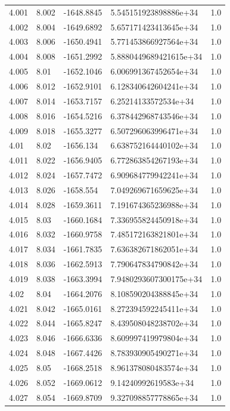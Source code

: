 \begin{tabular}{lllll}
4.001 & 8.002 & -1648.8845 & 5.545151923898886e+34 & 1.0 \\
4.002 & 8.004 & -1649.6892 & 5.657171423413645e+34 & 1.0 \\
4.003 & 8.006 & -1650.4941 & 5.771453866927564e+34 & 1.0 \\
4.004 & 8.008 & -1651.2992 & 5.8880449689421615e+34 & 1.0 \\
4.005 & 8.01 & -1652.1046 & 6.006991367452654e+34 & 1.0 \\
4.006 & 8.012 & -1652.9101 & 6.128340642604241e+34 & 1.0 \\
4.007 & 8.014 & -1653.7157 & 6.25214133572534e+34 & 1.0 \\
4.008 & 8.016 & -1654.5216 & 6.378442968743546e+34 & 1.0 \\
4.009 & 8.018 & -1655.3277 & 6.507296063996471e+34 & 1.0 \\
4.01 & 8.02 & -1656.134 & 6.638752164440102e+34 & 1.0 \\
4.011 & 8.022 & -1656.9405 & 6.772863854267193e+34 & 1.0 \\
4.012 & 8.024 & -1657.7472 & 6.909684779942241e+34 & 1.0 \\
4.013 & 8.026 & -1658.554 & 7.049269671659625e+34 & 1.0 \\
4.014 & 8.028 & -1659.3611 & 7.191674365236988e+34 & 1.0 \\
4.015 & 8.03 & -1660.1684 & 7.336955824450918e+34 & 1.0 \\
4.016 & 8.032 & -1660.9758 & 7.485172163821801e+34 & 1.0 \\
4.017 & 8.034 & -1661.7835 & 7.636382671862051e+34 & 1.0 \\
4.018 & 8.036 & -1662.5913 & 7.790647834790842e+34 & 1.0 \\
4.019 & 8.038 & -1663.3994 & 7.9480293607300175e+34 & 1.0 \\
4.02 & 8.04 & -1664.2076 & 8.108590204388845e+34 & 1.0 \\
4.021 & 8.042 & -1665.0161 & 8.272394592245411e+34 & 1.0 \\
4.022 & 8.044 & -1665.8247 & 8.439508048238702e+34 & 1.0 \\
4.023 & 8.046 & -1666.6336 & 8.609997419979804e+34 & 1.0 \\
4.024 & 8.048 & -1667.4426 & 8.783930905490271e+34 & 1.0 \\
4.025 & 8.05 & -1668.2518 & 8.961378080483574e+34 & 1.0 \\
4.026 & 8.052 & -1669.0612 & 9.14240992619583e+34 & 1.0 \\
4.027 & 8.054 & -1669.8709 & 9.327098857778865e+34 & 1.0 \\

\end{tabular}
